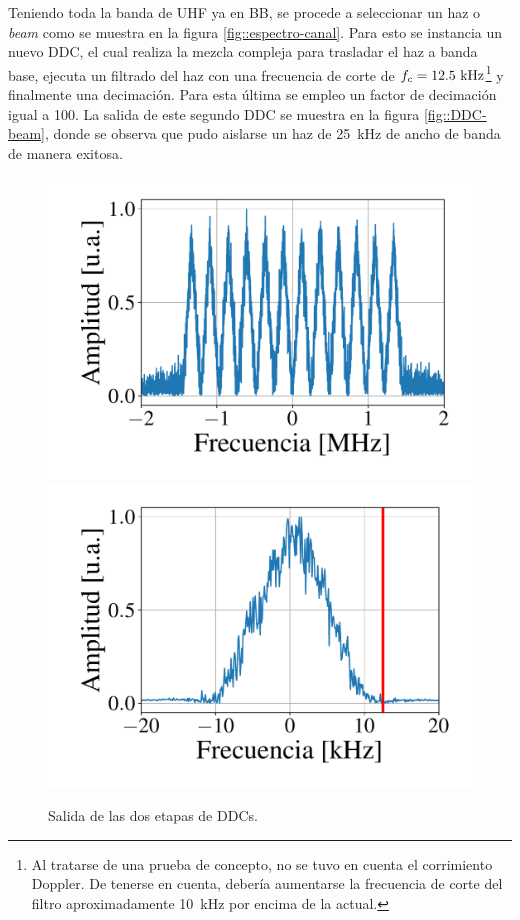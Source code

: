 \documentclass[../../main.tex]{subfiles}
\begin{document}
Teniendo toda la banda de UHF ya en BB, se procede a seleccionar un haz o \textit{beam} como se muestra en la figura \ref{fig::espectro-canal}. 
Para esto se instancia un nuevo DDC, el cual realiza la mezcla compleja para trasladar el haz a banda base, ejecuta un filtrado del haz con una frecuencia de corte de $f_c = 12.5~\textrm{kHz}$\footnote{Al tratarse de una prueba de concepto, no se tuvo en cuenta el corrimiento Doppler. 
De tenerse en cuenta, debería aumentarse la frecuencia de corte del filtro aproximadamente 10~kHz por encima de la actual.} y finalmente una decimación. 
Para esta última se empleo un factor de decimación igual a 100. La salida de este segundo DDC se muestra en la figura \ref{fig::DDC-beam}, donde se observa que pudo aislarse un haz de 25~kHz de ancho de banda de manera exitosa.


\begin{figure}[H]
    \centering
    {\includegraphics[width=0.49\linewidth]{DDC-band.pdf}}
    \hspace{\fill}%
    {\includegraphics[width=0.49\linewidth]{DDC-beam.pdf}}
    \caption{Salida de las dos etapas de DDCs.}
    \label{fig::DDC-output}
\end{figure}
\end{document}
